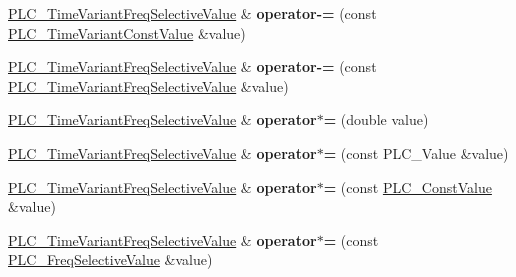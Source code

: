 \begin{DoxyCompactItemize}
\item 
\hypertarget{classns3_1_1PLC__TimeVariantFreqSelectiveValue_abe62203a9a35c4a9e4173e6fbe93f4c9}{\hyperlink{classns3_1_1PLC__TimeVariantFreqSelectiveValue}{\-P\-L\-C\-\_\-\-Time\-Variant\-Freq\-Selective\-Value} \& {\bfseries operator-\/=} (const \hyperlink{classns3_1_1PLC__TimeVariantConstValue}{\-P\-L\-C\-\_\-\-Time\-Variant\-Const\-Value} \&value)}\label{classns3_1_1PLC__TimeVariantFreqSelectiveValue_abe62203a9a35c4a9e4173e6fbe93f4c9}

\item 
\hypertarget{classns3_1_1PLC__TimeVariantFreqSelectiveValue_a634581575aaf8c8b8b155c7934b04679}{\hyperlink{classns3_1_1PLC__TimeVariantFreqSelectiveValue}{\-P\-L\-C\-\_\-\-Time\-Variant\-Freq\-Selective\-Value} \& {\bfseries operator-\/=} (const \hyperlink{classns3_1_1PLC__TimeVariantFreqSelectiveValue}{\-P\-L\-C\-\_\-\-Time\-Variant\-Freq\-Selective\-Value} \&value)}\label{classns3_1_1PLC__TimeVariantFreqSelectiveValue_a634581575aaf8c8b8b155c7934b04679}

\item 
\hypertarget{classns3_1_1PLC__TimeVariantFreqSelectiveValue_a50d6ff7913ed36d438179053ff6d73a0}{\hyperlink{classns3_1_1PLC__TimeVariantFreqSelectiveValue}{\-P\-L\-C\-\_\-\-Time\-Variant\-Freq\-Selective\-Value} \& {\bfseries operator$\ast$=} (double value)}\label{classns3_1_1PLC__TimeVariantFreqSelectiveValue_a50d6ff7913ed36d438179053ff6d73a0}

\item 
\hypertarget{classns3_1_1PLC__TimeVariantFreqSelectiveValue_aaeb6325603deca33daa57fac1d1953e6}{\hyperlink{classns3_1_1PLC__TimeVariantFreqSelectiveValue}{\-P\-L\-C\-\_\-\-Time\-Variant\-Freq\-Selective\-Value} \& {\bfseries operator$\ast$=} (const \-P\-L\-C\-\_\-\-Value \&value)}\label{classns3_1_1PLC__TimeVariantFreqSelectiveValue_aaeb6325603deca33daa57fac1d1953e6}

\item 
\hypertarget{classns3_1_1PLC__TimeVariantFreqSelectiveValue_aa2aa668adb5c9a4b79d8ada432132ad7}{\hyperlink{classns3_1_1PLC__TimeVariantFreqSelectiveValue}{\-P\-L\-C\-\_\-\-Time\-Variant\-Freq\-Selective\-Value} \& {\bfseries operator$\ast$=} (const \hyperlink{classns3_1_1PLC__ConstValue}{\-P\-L\-C\-\_\-\-Const\-Value} \&value)}\label{classns3_1_1PLC__TimeVariantFreqSelectiveValue_aa2aa668adb5c9a4b79d8ada432132ad7}

\item 
\hypertarget{classns3_1_1PLC__TimeVariantFreqSelectiveValue_ad91ddbd01922a1520eebc38427af91a8}{\hyperlink{classns3_1_1PLC__TimeVariantFreqSelectiveValue}{\-P\-L\-C\-\_\-\-Time\-Variant\-Freq\-Selective\-Value} \& {\bfseries operator$\ast$=} (const \hyperlink{classns3_1_1PLC__FreqSelectiveValue}{\-P\-L\-C\-\_\-\-Freq\-Selective\-Value} \&value)}\label{classns3_1_1PLC__TimeVariantFreqSelectiveValue_ad91ddbd01922a1520eebc38427af91a8}


\end{DoxyCompactItemize}
